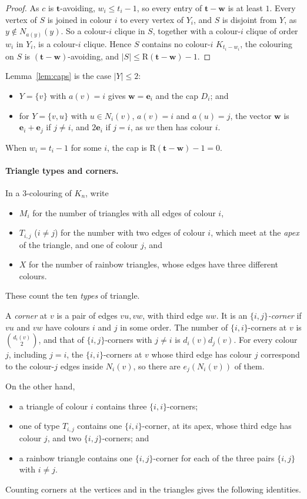 \documentclass[11pt]{article}
\theoremstyle{spacedplain}
\theoremstyle{spaceddef}
\theoremstyle{spacedremark}
\newcommand{\R}{\mathrm{R}}
\newcommand{\bt}{\mathbf{t}}
\newcommand{\e}{\mathbf{e}}
\begin{document}
\begin{proof}
As $c$ is $\bt$-avoiding, $w_i\le t_i-1$, so every entry of $\bt-\mathbf w$ is at least $1$.
Every vertex of $S$ is joined in colour $i$ to every vertex of $Y_i$, and $S$ is disjoint from $Y$, as $y\notin N_{a(y)}(y)$.
So a colour-$i$ clique in $S$, together with a colour-$i$ clique of order $w_i$ in $Y_i$, is a colour-$i$ clique.
Hence $S$ contains no colour-$i$ $K_{t_i-w_i}$, the colouring on $S$ is $(\bt-\mathbf w)$-avoiding, and $|S|\le\R(\bt-\mathbf w)-1$.
\end{proof}

Lemma~\ref{lem:caps} is the case $|Y|\le 2$:
\begin{itemize}
\item $Y=\{v\}$ with $a(v)=i$ gives $\mathbf w=\e_i$ and the cap $D_i$; and
\item for $Y=\{v,u\}$ with $u\in N_i(v)$, $a(v)=i$ and $a(u)=j$, the vector $\mathbf w$ is $\e_i+\e_j$ if $j\ne i$, and $2\e_i$ if $j=i$, as $uv$ then has colour $i$.
\end{itemize}
When $w_i=t_i-1$ for some $i$, the cap is $\R(\bt-\mathbf w)-1=0$.

\paragraph{Triangle types and corners.}
In a $3$-colouring of $K_n$, write
\begin{itemize}
\item $M_i$ for the number of triangles with all edges of colour $i$,
\item $T_{i,j}$ ($i\ne j$) for the number with two edges of colour $i$, which meet at the \emph{apex} of the triangle, and one of colour $j$, and
\item $X$ for the number of rainbow triangles, whose edges have three different colours.
\end{itemize}
These count the ten \emph{types} of triangle.

A \emph{corner} at $v$ is a pair of edges $vu,vw$, with third edge $uw$.
It is an \emph{$\{i,j\}$-corner} if $vu$ and $vw$ have colours $i$ and $j$ in some order.
The number of $\{i,i\}$-corners at $v$ is $\binom{d_i(v)}{2}$, and that of $\{i,j\}$-corners with $j\ne i$ is $d_i(v)d_j(v)$.
For every colour $j$, including $j=i$, the $\{i,i\}$-corners at $v$ whose third edge has colour $j$ correspond to the colour-$j$ edges inside $N_i(v)$, so there are $e_j(N_i(v))$ of them.

On the other hand,
\begin{itemize}
\item a triangle of colour $i$ contains three $\{i,i\}$-corners;
\item one of type $T_{i,j}$ contains one $\{i,i\}$-corner, at its apex, whose third edge has colour $j$, and two $\{i,j\}$-corners; and
\item a rainbow triangle contains one $\{i,j\}$-corner for each of the three pairs $\{i,j\}$ with $i\ne j$.
\end{itemize}
Counting corners at the vertices and in the triangles gives the following identities.
\end{document}
